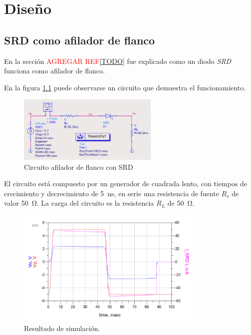 \chapter{Diseño}

\section{SRD como afilador de flanco}
\label{sec:srd_sharpener}

En la sección \textcolor{red}{AGREGAR REF\ref{TODO}} fue explicado como un diodo
\textit{SRD} funciona como afilador de flanco.

En la figura \ref{fig:srd_sharpener} puede observarse un circuito que demuestra
el funcionamiento.

\begin{figure}
  \centering
    \includegraphics[width=0.6\textwidth]{images/srd_sharpener_circuit.png}
    \caption{Circuito afilador de flanco con SRD}
    \label{fig:srd_sharpener}
\end{figure}

El circuito está compuesto por un generador de cuadrada lento, con tiempos de
crecimiento y decrecimiento de \qty{5}{\nano\second}, en serie una resistencia
de fuente $R_s$ de valor \qty{50}{\ohm}. La carga del circuito es la resistencia
$R_L$ de \qty{50}{\ohm}.

\begin{figure}[tbp]
    \centering
    \includegraphics[width=0.8\textwidth]{images/srd_sharpener_result.png}
    \caption{Resultado de simulación.}
    \label{fig:srd_sharpener_result}
\end{figure}

